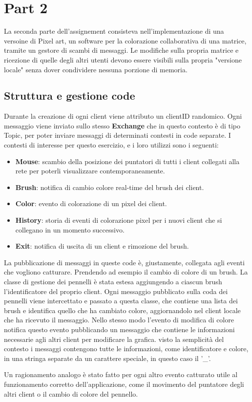 \chapter{Part 2}
\label{ch:into} %

La seconda parte dell'assignement consisteva nell'implementazione di una versoine di Pixel art, un software per la colorazione 
collaborativa di una matrice, tramite un gestore di scambi di messaggi. Le modifiche sulla propria matrice e ricezione di quelle degli altri utenti 
devono essere visibili sulla propria "versione locale" senza dover condividere nessuna porzione di memoria.

\section{Struttura e gestione code}

Durante la creazione di ogni client viene attributo un clientID randomico. Ogni messaggio viene inviato sullo stesso \textbf{Exchange} che in questo contesto
è di tipo Topic, per poter inviare messaggi di determinati contesti in code separate. I contesti di interesse per questo esercizio, e i loro utilizzi sono i seguenti: 
\begin{itemize}
    \item \textbf{Mouse}: scambio della posizione dei puntatori di tutti i client collegati alla rete per poterli visualizzare contemporaneamente.
    \item \textbf{Brush}: notifica di cambio colore real-time del brush dei client.
    \item \textbf{Color}: evento di colorazione di un pixel dei client.
    \item \textbf{History}: storia di eventi di colorazione pixel per i nuovi client che si collegano in un momento successivo. 
    \item \textbf{Exit}: notifica di uscita di un client e rimozione del brush.
\end{itemize}

La pubblicazione di messaggi in queste code è, giustamente, collegata agli eventi che vogliono catturare.
Prendendo ad esempio il cambio di colore di un brush. La classe di gestione dei pennelli è stata estesa aggiungendo a ciascun brush l'identificatore del proprio client.
Ogni messaggio pubblicato sulla coda dei pennelli viene intercettato e passato a questa classe, che contiene una lista dei brush e identifica quello che ha cambiato colore, aggiornandolo nel client locale che ha ricevuto il messaggio. 
Nello stesso modo l'evento di modifica di colore notifica questo evento pubblicando un messaggio che contiene le informazioni
necessarie agli altri client per modificare la grafica. visto la semplicità del contesto i messaggi contengono tutte le informazioni, come identificatore e colore, in una stringa 
separate da un carattere speciale, in questo caso il '\_'.

Un ragionamento analogo è stato fatto per ogni altro evento catturato utile al funzionamento corretto dell'applicazione, come il movimento del puntatore 
degli altri client o il cambio di colore del pennello.

